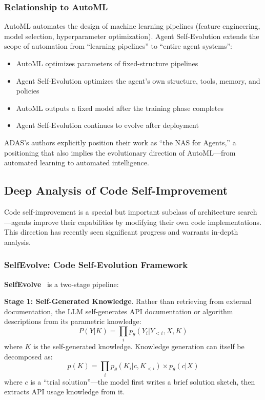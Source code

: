 \subsubsection{Relationship to AutoML}

AutoML automates the design of machine learning pipelines (feature engineering, model selection, hyperparameter optimization). Agent Self-Evolution extends the scope of automation from ``learning pipelines'' to ``entire agent systems'':
\begin{itemize}
\item AutoML optimizes parameters of fixed-structure pipelines
\item Agent Self-Evolution optimizes the agent's own structure, tools, memory, and policies
\item AutoML outputs a fixed model after the training phase completes
\item Agent Self-Evolution continues to evolve after deployment
\end{itemize}

ADAS's authors explicitly position their work as ``the NAS for Agents,'' a positioning that also implies the evolutionary direction of AutoML---from automated learning to automated intelligence.

\subsection{Deep Analysis of Code Self-Improvement}\label{sec:ch3-code-selfevolve}

Code self-improvement is a special but important subclass of architecture search---agents improve their capabilities by modifying their own code implementations. This direction has recently seen significant progress and warrants in-depth analysis.

\subsubsection{SelfEvolve: Code Self-Evolution Framework}

\textbf{SelfEvolve}~\citep{selfevolve2023} is a two-stage pipeline:

\textbf{Stage 1: Self-Generated Knowledge}. Rather than retrieving from external documentation, the LLM self-generates API documentation or algorithm descriptions from its parametric knowledge:
\begin{equation}
P(Y|K) = \prod_i p_\theta(Y_i | Y_{<i}, X, K)
\label{eq:selfevolve-knowledge}
\end{equation}
where $K$ is the self-generated knowledge. Knowledge generation can itself be decomposed as:
\begin{equation}
p(K) = \prod_i p_\theta(K_i | c, K_{<i}) \times p_\theta(c | X)
\label{eq:selfevolve-decompose}
\end{equation}
where $c$ is a ``trial solution''---the model first writes a brief solution sketch, then extracts API usage knowledge from it.

